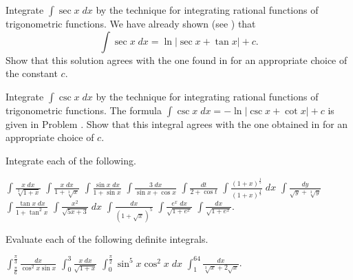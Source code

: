\begin{exercises}

\begin{exenum}
\x
{}
Integrate $\int \sec x \; dx$ by the technique
for integrating rational functions of
trigonometric functions.
\x
We have already shown (see ) that
\[
\int \sec x \; dx = \ln|\sec x + \tan x| + c
.
\]
Show that this solution agrees with the one found
in  for an appropriate
choice of the constant $c$.
\end{exenum}

\begin{exenum}
\x
{}
Integrate $\int \csc x \; dx$ by the technique
for integrating rational functions of
trigonometric functions.
\x
The formula $\int \csc x \; dx = -\ln|\csc x+\cot x|+c$
is given in Problem .
Show that this integral agrees with the one obtained
in  for an appropriate choice of $c$.
\end{exenum}

Integrate each of the following.
\begin{exenum}
\x
$\int \frac{x\;dx}{\sqrt[3]{1+x}}$
\x
$\int \frac{x\;dx}{1+\sqrt[3]x}$
\x
$\int \frac{\sin x\;dx}{1+\sin x}$
\x
$\int \frac{3\;dx}{\sin x + \cos x}$
\x
$\int \frac{dt}{2+\cos t}$
\x
$\int \frac{(1+x)^{\frac15}}{(1+x)^{\frac13}}\;dx$
\x
$\int \frac{dy}{\sqrt y + \sqrt[3]y}$
\x
$\int \frac{\tan x \; dx}{1+\tan^2x}$
\x
$\int \frac{x^2}{\sqrt{5x+3}}\;dx$
\x
$\int \frac{dx}{(1+\sqrt x)^5}$
\x
$\int \frac{e^x\;dx}{\sqrt{1+e^x}}$
\x
$\int \frac{dx}{\sqrt{1+e^x}}$.
\end{exenum}

Evaluate each of the following definite integrals.
\begin{exenum}
\x
$\int_{\frac{\pi}6}^{\frac{\pi}3} \frac{dx}{\cos^2x\sin x}$
\x
$\int_0^3 \frac{x\;dx}{\sqrt{1+x}}$
\x
$\int_0^{\frac{\pi}2} \sin^5x \cos^2x \; dx$
\x
$\int_1^{64} \frac{dx}{\sqrt[3]x + 2\sqrt{x}}$.
\end{exenum}






















\end{exercises}
